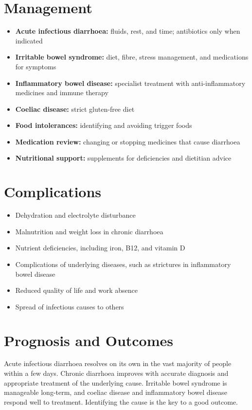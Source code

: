 \section*{Management}
\begin{itemize}
    \item \textbf{Acute infectious diarrhoea:} fluids, rest, and time; antibiotics only when indicated
    \item \textbf{Irritable bowel syndrome:} diet, fibre, stress management, and medications for symptoms
    \item \textbf{Inflammatory bowel disease:} specialist treatment with anti-inflammatory medicines and immune therapy
    \item \textbf{Coeliac disease:} strict gluten-free diet
    \item \textbf{Food intolerances:} identifying and avoiding trigger foods
    \item \textbf{Medication review:} changing or stopping medicines that cause diarrhoea
    \item \textbf{Nutritional support:} supplements for deficiencies and dietitian advice
\end{itemize}

\section*{Complications}
\begin{itemize}
    \item Dehydration and electrolyte disturbance
    \item Malnutrition and weight loss in chronic diarrhoea
    \item Nutrient deficiencies, including iron, B12, and vitamin D
    \item Complications of underlying diseases, such as strictures in inflammatory bowel disease
    \item Reduced quality of life and work absence
    \item Spread of infectious causes to others
\end{itemize}

\section*{Prognosis and Outcomes}
Acute infectious diarrhoea resolves on its own in the vast majority of people within a few days. Chronic diarrhoea improves with accurate diagnosis and appropriate treatment of the underlying cause. Irritable bowel syndrome is manageable long-term, and coeliac disease and inflammatory bowel disease respond well to treatment. Identifying the cause is the key to a good outcome.

